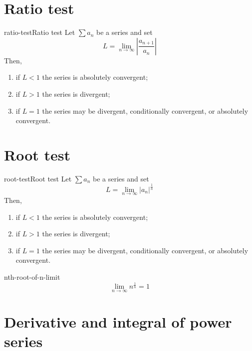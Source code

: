 \documentclass[preview]{standalone}
\begin{document}
\section{Ratio test}

\begin{snippettheorem}{ratio-test}{Ratio test}
    Let \(\sum a_n\) be a series and set
    \[
        L = \lim_{n \to \infty} | \frac{a_{n+1}}{a_n} |
    \]
    Then,
    \begin{enumerate}
        \item if \(L < 1\) the series is absolutely convergent;
        \item if \(L > 1\) the series is divergent;
        \item if \(L = 1\) the series may be divergent, conditionally convergent, or absolutely convergent.
    \end{enumerate}
\end{snippettheorem}

\section{Root test}

\begin{snippettheorem}{root-test}{Root test}
    Let \(\sum a_n\) be a series and set
    \[
        L = \lim_{n \to \infty} {|a_n|}^{\frac{1}{n}}
    \]
    Then,
    \begin{enumerate}
        \item if \(L < 1\) the series is absolutely convergent;
        \item if \(L > 1\) the series is divergent;
        \item if \(L = 1\) the series may be divergent, conditionally convergent, or absolutely convergent.
    \end{enumerate}
\end{snippettheorem}

\begin{snippetproposition}{nth-root-of-n-limit}{}
    \[ \lim_{n \to \infty} n^{\frac{1}{n}} = 1 \]
\end{snippetproposition}

\section{Derivative and integral of power series}


\end{document}
